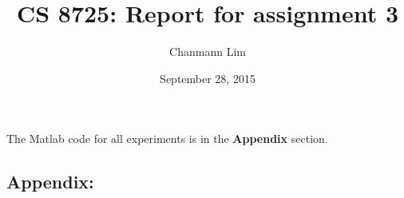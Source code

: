 \documentclass[a4paper]{article}
\begin{document}
\title{CS 8725: Report for assignment 3}
\author{Chanmann Lim}
\date{September 28, 2015}
\maketitle

\noindent
	The Matlab code for all experiments is in the \textbf{Appendix} section. \\

\newpage
\subsection*{Appendix:}
	
	
	
\end{document}
